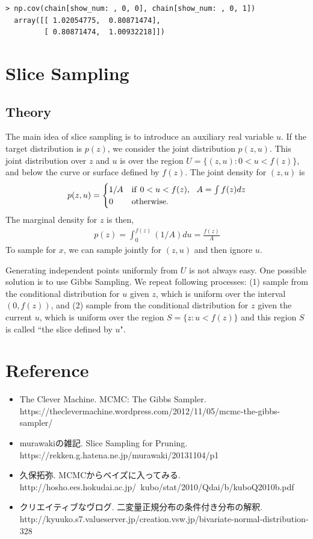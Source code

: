 \documentclass[a4paper,10.5pt,uplatex]{jsarticle}  %
\begin{document}
\begin{lstlisting}
> np.cov(chain[show_num: , 0, 0], chain[show_num: , 0, 1])
  array([[ 1.02054775,  0.80871474],
         [ 0.80871474,  1.00932218]])
\end{lstlisting}

\section{Slice Sampling}
\subsection{Theory}
The main idea of slice sampling is to introduce an auxiliary real variable $u$. If the target distribution is $p(z)$, we consider the joint distribution $p(z,u)$. This joint distribution over $z$ and $u$ is over the region $U = \{ (z,u): 0<u<f(z) \}$, and below the curve or surface defined by $f(z)$. The joint density for $(z,u)$ is
\begin{align}
p(z,u) =\begin{cases} 1 / A & {\rm if\ } 0 < u < f(z), \ \ A = \int f(z) dz \\ 0 & {\rm otherwise.} \end{cases} 
\end{align}
The marginal density for $z$ is then,
\begin{align}
  p(z) = \int_{0}^{f(z)} (1/A) du = \frac{f(z)}{A}
\end{align}
To sample for $x$, we can sample jointly for $(z,u)$ and then ignore $u$.\par
Generating independent points uniformly from $U$ is not always easy. One possible solution is to use Gibbs Sampling. We repeat following processes: (1) sample from the conditional distribution for $u$ given $z$, which is uniform over the interval $(0, f(z))$, and (2) sample from the conditional distribution for $z$ given the current $u$, which is uniform over the region $S= \{ z : u < f(z) \}$ and this region $S$ is called ``the slice defined by $u$".

\section*{Reference}
\begin{itemize}
  \item The Clever Machine. MCMC: The Gibbs Sampler. https://theclevermachine.wordpress.com/2012/11/05/mcmc-the-gibbs-sampler/
  \item murawakiの雑記. Slice Sampling for Pruning. https://rekken.g.hatena.ne.jp/murawaki/20131104/p1
  \item 久保拓弥. MCMCからベイズに入ってみる. http://hosho.ees.hokudai.ac.jp/~kubo/stat/2010/Qdai/b/kuboQ2010b.pdf
  \item クリエイティブなヴログ. 二変量正規分布の条件付き分布の解釈. http://kyuuko.s7.valueserver.jp/creation.vsw.jp/bivariate-normal-distribution-328
\end{itemize}
\end{document}
